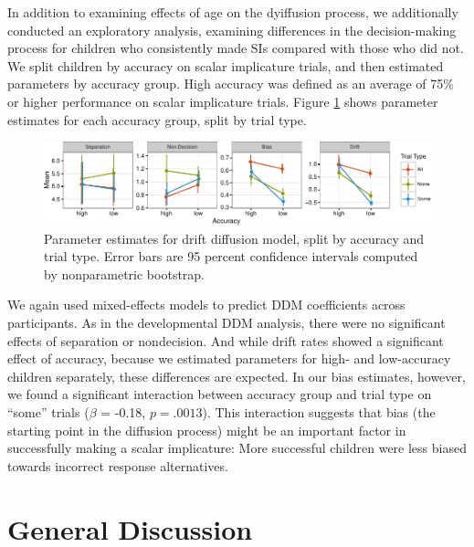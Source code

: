 \documentclass[10pt, letterpaper]{article}
\newenvironment{CodeChunk}{}{}
\begin{document}
In addition to examining effects of age on the dyiffusion process, we
additionally conducted an exploratory analysis, examining differences in
the decision-making process for children who consistently made SIs
compared with those who did not. We split children by accuracy on scalar
implicature trials, and then estimated parameters by accuracy group.
High accuracy was defined as an average of 75\% or higher performance on
scalar implicature trials. Figure \ref{fig:param_plot} shows parameter
estimates for each accuracy group, split by trial type.

\begin{CodeChunk}
\begin{figure}[t]

{\centering \includegraphics{figs/param_plot-1} 

}

\caption[Parameter estimates for drift diffusion model, split by accuracy and trial type]{Parameter estimates for drift diffusion model, split by accuracy and trial type. Error bars are 95 percent confidence intervals computed by nonparametric bootstrap.}\label{fig:param_plot}
\end{figure}
\end{CodeChunk}

We again used mixed-effects models to predict DDM coefficients across
participants. As in the developmental DDM analysis, there were no
significant effects of separation or nondecision. And while drift rates
showed a significant effect of accuracy, because we estimated parameters
for high- and low-accuracy children separately, these differences are
expected. In our bias estimates, however, we found a significant
interaction between accuracy group and trial type on ``some'' trials
(\(\beta\) = -0.18, \(p = .0013\)). This interaction suggests that bias
(the starting point in the diffusion process) might be an important
factor in successfully making a scalar implicature: More successful
children were less biased towards incorrect response alternatives.

\section{General Discussion}\label{general-discussion}
\end{document}
